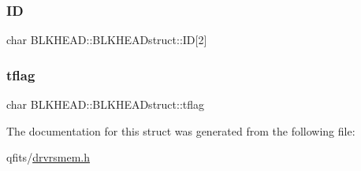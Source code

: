 \subsubsection{\texorpdfstring{ID}{ID}}
{\footnotesize\ttfamily char B\+L\+K\+H\+E\+A\+D\+::\+B\+L\+K\+H\+E\+A\+Dstruct\+::\+ID\mbox{[}2\mbox{]}}

\mbox{\label{struct_b_l_k_h_e_a_d_1_1_b_l_k_h_e_a_dstruct_a6516dba275037acb41fd46bd9db6abc1}} 
\subsubsection{\texorpdfstring{tflag}{tflag}}
{\footnotesize\ttfamily char B\+L\+K\+H\+E\+A\+D\+::\+B\+L\+K\+H\+E\+A\+Dstruct\+::tflag}



The documentation for this struct was generated from the following file\+:\begin{DoxyCompactItemize}
\item 
qfits/\hyperlink{drvrsmem_8h}{drvrsmem.\+h}\end{DoxyCompactItemize}
